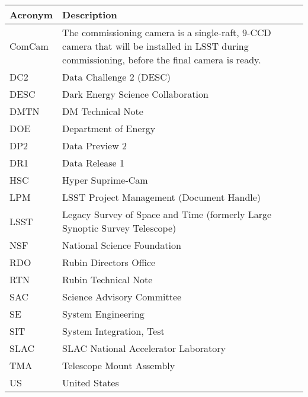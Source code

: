 \addtocounter{table}{-1}
\begin{longtable}{p{}p{}}\hline
\textbf{Acronym} & \textbf{Description}  \\\hline

ComCam & The commissioning camera is a single-raft, 9-CCD camera that will be installed in LSST during commissioning, before the final camera is ready. \\\hline
DC2 & Data Challenge 2 (DESC) \\\hline
DESC & Dark Energy Science Collaboration \\\hline
DMTN & DM Technical Note \\\hline
DOE & Department of Energy \\\hline
DP2 & Data Preview 2 \\\hline
DR1 & Data Release 1 \\\hline
HSC & Hyper Suprime-Cam \\\hline
LPM & LSST Project Management (Document Handle) \\\hline
LSST & Legacy Survey of Space and Time (formerly Large Synoptic Survey Telescope) \\\hline
NSF & National Science Foundation \\\hline
RDO & Rubin Directors Office \\\hline
RTN & Rubin Technical Note \\\hline
SAC & Science Advisory Committee \\\hline
SE & System Engineering \\\hline
SIT & System Integration, Test \\\hline
SLAC & SLAC National Accelerator Laboratory \\\hline
TMA & Telescope Mount Assembly \\\hline
US & United States \\\hline
\end{longtable}
